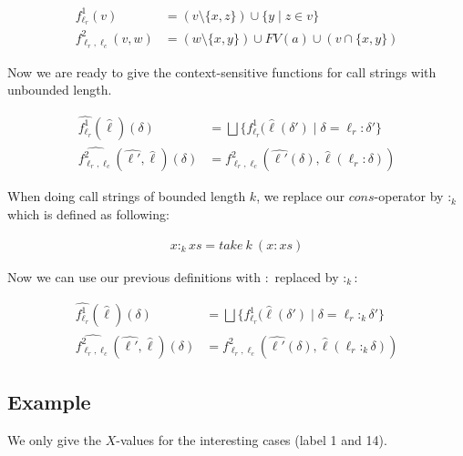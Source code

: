\documentclass[a4wide,12pt]{article}
\theoremstyle{definition}
\theoremstyle{plain}
\theoremstyle{remark}
\begin{document}
\begin{align}
f^1_{\ell_r} (v) & = (v \setminus \{x, z\}) \cup \{y \mid z \in v\} \\
f^2_{\ell_r, \ell_c} (v, w) & = (w \setminus \{x, y\}) \cup FV(a) \cup (v \cap \{x, y\})
\end{align}

Now we are ready to give the context-sensitive functions for call strings with
unbounded length.

\begin{align}
\widehat{f^1_{\ell_r}} (\widehat{\ell}) (\delta) & = \bigsqcup \{ f^1_{\ell_r} (\widehat{\ell}(\delta') \mid \delta = \ell_r : \delta' \} \\
\widehat{f^2_{\ell_r, \ell_c}} (\widehat{\ell'}, \widehat{\ell}) (\delta) & = f^2_{\ell_r, \ell_c} (\widehat{\ell'}(\delta), \widehat{\ell}(\ell_r : \delta))
\end{align}

When doing call strings of bounded length $k$, we replace our $cons$-operator by
$:_k$ which is defined as following:

\begin{align}
x :_k xs = take\ k\ (x : xs)
\end{align}

Now we can use our previous definitions with $:$ replaced by $:_k$:

\begin{align}
\widehat{f^1_{\ell_r}} (\widehat{\ell}) (\delta) & = \bigsqcup \{ f^1_{\ell_r} (\widehat{\ell}(\delta') \mid \delta = \ell_r :_k \delta' \} \\
\widehat{f^2_{\ell_r, \ell_c}} (\widehat{\ell'}, \widehat{\ell}) (\delta) & = f^2_{\ell_r, \ell_c} (\widehat{\ell'}(\delta), \widehat{\ell}(\ell_r :_k \delta))
\end{align}

\subsection{Example}
We only give the $X$-values for the interesting cases (label 1 and 14).
\end{document}

